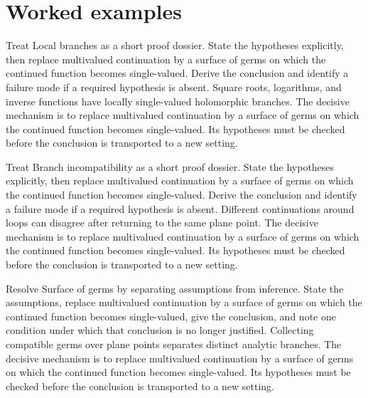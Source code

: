 \section{Worked examples}

\begin{example}\label{ex:iv22-worked-01}
Treat Local branches as a short proof dossier. State the hypotheses explicitly, then replace multivalued continuation by a surface of germs on which the continued function becomes single-valued. Derive the conclusion and identify a failure mode if a required hypothesis is absent. Square roots, logarithms, and inverse functions have locally single-valued holomorphic branches. The decisive mechanism is to replace multivalued continuation by a surface of germs on which the continued function becomes single-valued. Its hypotheses must be checked before the conclusion is transported to a new setting.
\end{example}

\begin{example}\label{ex:iv22-worked-02}
Treat Branch incompatibility as a short proof dossier. State the hypotheses explicitly, then replace multivalued continuation by a surface of germs on which the continued function becomes single-valued. Derive the conclusion and identify a failure mode if a required hypothesis is absent. Different continuations around loops can disagree after returning to the same plane point. The decisive mechanism is to replace multivalued continuation by a surface of germs on which the continued function becomes single-valued. Its hypotheses must be checked before the conclusion is transported to a new setting.
\end{example}

\begin{example}\label{ex:iv22-worked-03}
Resolve Surface of germs by separating assumptions from inference. State the assumptions, replace multivalued continuation by a surface of germs on which the continued function becomes single-valued, give the conclusion, and note one condition under which that conclusion is no longer justified. Collecting compatible germs over plane points separates distinct analytic branches. The decisive mechanism is to replace multivalued continuation by a surface of germs on which the continued function becomes single-valued. Its hypotheses must be checked before the conclusion is transported to a new setting.
\end{example}

